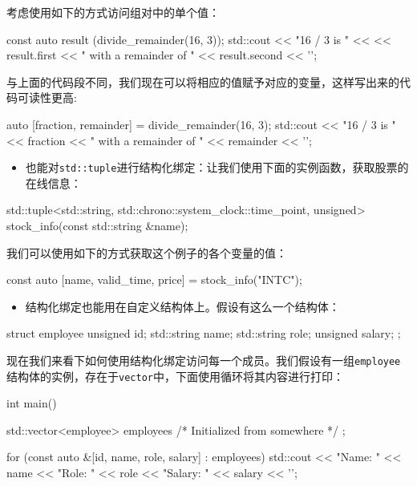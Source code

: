考虑使用如下的方式访问组对中的单个值：

\begin{codebox}[cpp]
const auto result (divide_remainder(16, 3));
std::cout << "16 / 3 is " <<
          << result.first << " with a remainder of "
          << result.second << '\n';
\end{codebox}

与上面的代码段不同，我们现在可以将相应的值赋予对应的变量，这样写出来的代码可读性更高:

\begin{codebox}[cpp]
auto [fraction, remainder] = divide_remainder(16, 3);
std::cout << "16 / 3 is "
          << fraction << " with a remainder of "
          << remainder << '\n';
\end{codebox}

\begin{itemize}
\item 也能对\texttt{std::tuple}进行结构化绑定：让我们使用下面的实例函数，获取股票的在线信息：

\end{itemize}

\begin{codebox}[cpp]
std::tuple<std::string, std::chrono::system_clock::time_point, unsigned>
stock_info(const std::string &name);
\end{codebox}

我们可以使用如下的方式获取这个例子的各个变量的值：

\begin{codebox}[cpp]
const auto [name, valid_time, price] = stock_info("INTC");
\end{codebox}

\begin{itemize}
\item 结构化绑定也能用在自定义结构体上。假设有这么一个结构体：

\end{itemize}

\begin{codebox}[cpp]
struct employee{
    unsigned id;
    std::string name;
    std::string role;
    unsigned salary;
};
\end{codebox}

现在我们来看下如何使用结构化绑定访问每一个成员。我们假设有一组\texttt{employee}结构体的实例，存在于\texttt{vector}中，下面使用循环将其内容进行打印：

\begin{codebox}[cpp]
int main(){
    std::vector<employee> employees{
        /* Initialized from somewhere */
    };
    
    for (const auto &[id, name, role, salary] : employees){
        std::cout << "Name: " << name
                  << "Role: " << role
                  << "Salary: " << salary << '\n';
    }
}
\end{codebox}

